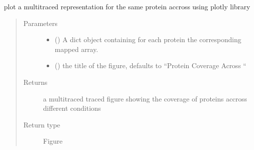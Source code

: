 \documentclass[letterpaper,10pt,english]{sphinxmanual}
\begin{document}
\begin{fulllineitems}
\label{\detokenize{IPTK.Visualization:IPTK.Visualization.vizTools.plotly_multi_traced_coverage_representation}}
plot a multi\sphinxhyphen{}traced representation for the same protein accross  using plotly library
\begin{quote}\begin{description}
\item[{Parameters}] \leavevmode\begin{itemize}
\item {} 
 (\sphinxstyleliteralemphasis{\sphinxupquote{{[}}}\sphinxstyleliteralemphasis{\sphinxupquote{{]}}}) \textendash{} A dict object containing for each protein the corresponding mapped array.

\item {} 
 (\sphinxstyleliteralemphasis{\sphinxupquote{, }}) \textendash{} the title of the figure, defaults to “Protein Coverage Across  “

\end{itemize}

\item[{Returns}] \leavevmode
a multitraced traced figure showing the coverage of proteins accross different conditions

\item[{Return type}] \leavevmode
Figure

\end{description}\end{quote}

\end{fulllineitems}

\end{document}
